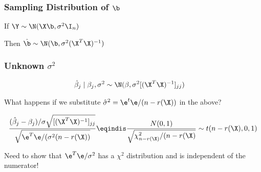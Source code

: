 \documentclass{beamer}
\begin{document}



\begin{frame}
  \frametitle{Sampling Distribution of $\b$}
If  $\Y \sim \N(\X\b, \sigma^2 \I_n)$

Then $\hat{\b} \sim \N(\b, \sigma^2 (\X^T\X)^{-1})$
\vfill

\end{frame}


\begin{frame} \frametitle{Unknown $\sigma^2$}

  \begin{align*}
    \hat{\beta}_j \mid \beta_j, \sigma^2 & \sim \N(\beta, { \sigma^2}
                                           [(\X^T\X)^{-1}]_{jj})
  \end{align*}  \pause

What happens if we substitute $\hat{\sigma}^2 = \e^t\e/(n-r(\X))$ in the above? \pause

$$
\frac{(\hat{\beta}_j - \beta_j)/ \sigma \sqrt{ [(\X^T\X)^{-1}]_{jj}}}
{\sqrt{\e^T\e/ (\sigma^2 (n - r(\X))} } \eqindis
\frac{N(0,1)}{\sqrt{\chi_{n-r(\X)}^2/(n - r(\X)}} \sim t(n - r(\X), 0 ,1)
$$

Need to show that $\e^T\e /\sigma^2$ has a $\chi^2$ distribution and
is independent of the numerator!
\end{frame}
\end{document}
